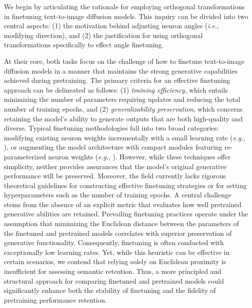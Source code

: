 \begin{itemize}[leftmargin=*,nosep]

We begin by articulating the rationale for employing orthogonal transformations in finetuning text-to-image diffusion models. This inquiry can be divided into two central aspects: (1) the motivation behind adjusting neuron angles (\emph{i.e.}, modifying direction), and (2) the justification for using orthogonal transformations specifically to effect angle finetuning.

At their core, both tasks focus on the challenge of how to finetune text-to-image diffusion models in a manner that maintains the strong generative capabilities achieved during pretraining. The primary criteria for an effective finetuning approach can be delineated as follows: (1) \emph{training efficiency}, which entails minimizing the number of parameters requiring updates and reducing the total number of training epochs, and (2) \emph{generalizability preservation}, which concerns retaining the model’s ability to generate outputs that are both high-quality and diverse. Typical finetuning methodologies fall into two broad categories: modifying existing neuron weights incrementally with a small learning rate (\emph{e.g.}, \cite{ruiz2023dreambooth}), or augmenting the model architecture with compact modules featuring re-parameterized neuron weights (\emph{e.g.}, \cite{hulora2022,zhang2023adding}). However, while these techniques offer simplicity, neither provides assurances that the model’s original generative performance will be preserved. Moreover, the field currently lacks rigorous theoretical guidelines for constructing effective finetuning strategies or for setting hyperparameters such as the number of training epochs. A central challenge stems from the absence of an explicit metric that evaluates how well pretrained generative abilities are retained. Prevailing finetuning practices operate under the assumption that minimizing the Euclidean distance between the parameters of the finetuned and pretrained models correlates with superior preservation of generative functionality. Consequently, finetuning is often conducted with exceptionally low learning rates. Yet, while this heuristic can be effective in certain scenarios, we contend that relying solely on Euclidean proximity is insufficient for assessing semantic retention. Thus, a more principled and structural approach for comparing finetuned and pretrained models could significantly enhance both the stability of finetuning and the fidelity of pretraining performance retention.


\end{itemize}
